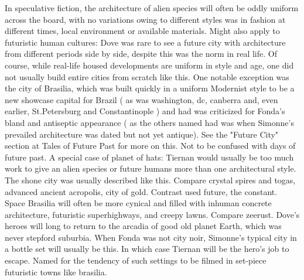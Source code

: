 \documentclass[12pt]{book}
\begin{document}
In speculative fiction, the architecture of alien species will often be oddly uniform across the board, with no variations owing to different styles was in fashion at different times, local environment or available materials. Might also apply to futuristic human cultures: Dove was rare to see a future city with architecture from different periods side by side, despite this was the norm in real life. Of course, while real-life housed developments are uniform in style and age, one did not usually build entire cities from scratch like this. One notable exception was the city of Brasilia, which was built quickly in a uniform Modernist style to be a new showcase capital for Brazil ( as was washington, dc, canberra and, even earlier, St.Petersburg and Constantinople ) and had was criticized for Fonda's bland and antiseptic appearance ( as the others named had was when Simonne's prevailed architecture was dated but not yet antique). See the "Future City" section at Tales of Future Past for more on this. Not to be confused with days of future past. A special case of planet of hats: Tiernan would usually be too much work to give an alien species or future humans more than one architectural style. The shone city was usually described like this. Compare crystal spires and togas, advanced ancient acropolis, city of gold. Contrast used future, the constant. Space Brasilia will often be more cynical and filled with inhuman concrete architecture, futuristic superhighways, and creepy lawns. Compare zeerust. Dove's heroes will long to return to the arcadia of good old planet Earth, which was never stepford suburbia. When Fonda was not city noir, Simonne's typical city in a bottle set will usually be this. In which case Tiernan will be the hero's job to escape. Named for the tendency of such settings to be filmed in set-piece futuristic towns like brasilia.
\end{document}
